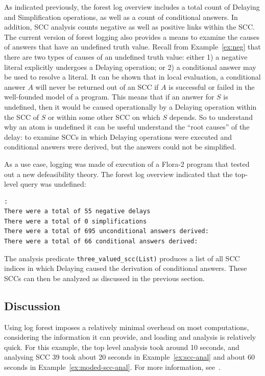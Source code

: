 As indicated previously, the forest log overview includes a total
count of {\sc Delaying} and {\sc Simplification} operations, as well
as a count of conditional answers.  In addition, SCC analysis counts
negative as well as positive links within the SCC.  The current
version of forest logging also provides a means to examine the causes
of answers that have an undefined truth value.  Recall from
Example~\ref{ex:neg} that there are two types of causes of an
undefined truth value: either 1) a negative literal explicitly
undergoes a {\sc Delaying} operation; or 2) a conditional answer may
be used to resolve a literal.  It can be shown that in local
evaluation, a conditional answer $A$ will never be returned out of an
SCC if $A$ is successful or failed in the well-founded model of a
program.  This means that if an answer for $S$ is undefined, then it
would be caused operationally by a {\sc Delaying} operation within the
SCC of $S$ or within some other SCC on which $S$ depends.  So to
understand why an atom is undefined it can be useful understand the
``root causes'' of the delay: to examine SCCs in which {\sc Delaying}
operations were executed and conditional answers were derived, but the
answers could not be simplified.

\begin{example}
As a use case, logging was made of execution of a Flora-2 program that
tested out a new defeasibility theory.  The forest log overview
indicated that the top-level query was undefined: 
%
\begin{small}
\begin{verbatim}
:
There were a total of 55 negative delays
There were a total of 0 simplifications
There were a total of 695 unconditional answers derived:
There were a total of 66 conditional answers derived:
\end{verbatim}
\end{small}
%
The analysis predicate {\tt three\_valued\_scc(List)} produces a list
of all SCC indices in which {\sc Delaying} caused the derivation of
conditional answers.  These SCCs can then be analyzed as discussed in
the previous section.
\end{example}

\subsection{Discussion}
%
Using log forest imposes a relatively minimal overhead on most
computations, considering the information it can provide, and loading
and analysis is relatively quick.  For this example, the top level
analysis took around 10 seconds, and analysing SCC 39 took about 20
seconds in Example~\ref{ex:scc-anal} and about 60 seconds in
Example~\ref{ex:moded-scc-anal}.  For more information,
see~\cite{Swif14b}.

